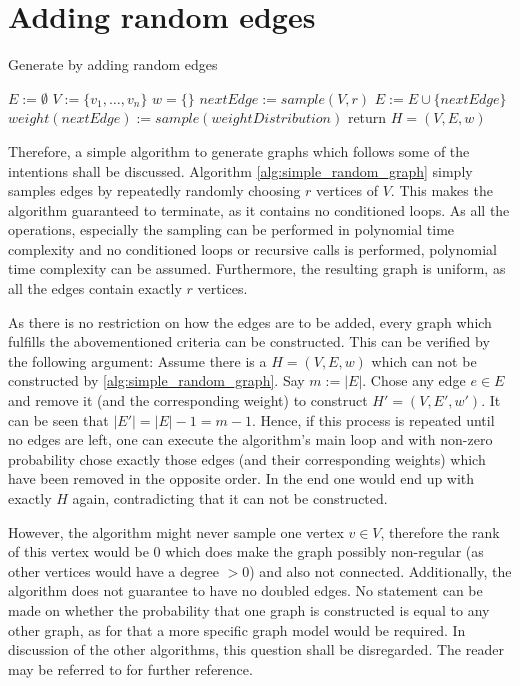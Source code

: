 \section{Adding random edges}
\begin{algorithm}[htpb]
	\caption{Generate by adding random edges\label{alg:simple_random_graph}} 
	\begin{algorithmic}
		\State $E := \emptyset$
		\State $V := \{v_1, \ldots, v_n\}$
		\State $w = \{\}$
		\State $nextEdge := sample(V, r) $
		\State $E := E \cup	 \{nextEdge\}$ %
		\State $weight(nextEdge) := sample(weightDistribution)$ 
		\EndFor
		\State return $H = (V, E, w)$
		\EndFunction 
	\end{algorithmic}
\end{algorithm}	
Therefore, a simple algorithm to generate graphs which follows some of the intentions shall be discussed. Algorithm \ref{alg:simple_random_graph} simply samples edges by repeatedly randomly choosing $r$ vertices of $V$. 
This makes the algorithm guaranteed to terminate, as it contains no conditioned loops. As all the operations, especially the sampling can be performed in polynomial time complexity and no conditioned loops or recursive calls is performed, polynomial time complexity can be assumed. Furthermore, the resulting graph is uniform, as all the edges contain exactly $r$ vertices. 

As there is no restriction on how the edges are to be added, every graph which fulfills the abovementioned criteria can be constructed. This can be verified by the following argument: Assume there is a $H = (V, E, w)$ which can not be constructed by \cref{alg:simple_random_graph}. Say $m:=|E|$. Chose any edge $e \in E$ and remove it (and the corresponding weight) to construct $H' = (V, E', w')$. It can be seen that $|E'|= |E|-1 = m-1 $. Hence, if this process is repeated until no edges are left, one can execute the algorithm's main loop and with non-zero probability chose exactly those edges (and their corresponding weights) which have been removed in the opposite order. In the end one would end up with exactly $H$ again, contradicting that it can not be constructed.

However, the algorithm might never sample one vertex $v \in V$, therefore the rank of this vertex would be $0$ which does make the graph possibly non-regular (as other vertices would have a degree $>0$) and also not connected. Additionally, the algorithm does not guarantee to have no doubled edges. No statement can be made on whether the probability that one graph is constructed is equal to any other graph, as for that a more specific graph model would be required. In discussion of the other algorithms, this question shall be disregarded. The reader may be referred to \cite{ghoshal2009random} for further reference.


